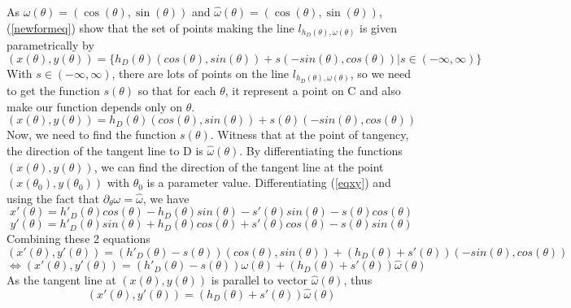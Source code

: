 \documentclass[a4paper]{article}
\begin{document}
\noindent As $\omega(\theta) = (\cos(\theta),\sin(\theta))$ and $\hat{\omega}(\theta) = (\cos(\theta),\sin(\theta))$, (\ref{newformeq}) show that the set of points making the line $l_{h_D(\theta),\omega(\theta)}$ is given parametrically by
\begin{equation*}
    (x(\theta),y(\theta)) = \{h_D(\theta)(cos(\theta),sin(\theta)) + s(-sin(\theta),cos(\theta)) | s \in (-\infty,\infty)\}
\end{equation*}
With $s \in (-\infty,\infty)$, there are lots of points on the line $l_{h_D(\theta),\omega(\theta)}$, so we need to get the function $s(\theta)$ so that for each $\theta$, it represent a point on C and also make our function depends only on $\theta$.
\begin{equation}\label{eqxy}
    (x(\theta),y(\theta)) = h_D(\theta)(cos(\theta),sin(\theta)) + s(\theta)(-sin(\theta),cos(\theta))
\end{equation}
Now, we need to find the function $s(\theta)$. Witness that at the point of tangency, the direction of the tangent line to D is $\hat{\omega}(\theta)$. By differentiating the functions $(x(\theta),y(\theta))$, we can find the direction of the tangent line at the point $(x(\theta_0),y(\theta_0))$ with $\theta_0$ is a parameter value. Differentiating (\ref{eqxy}) and using the fact that $\partial_\theta \omega = \hat{\omega}$, we have
\begin{equation*}
    x'(\theta) = h'_D(\theta)cos(\theta) - h_D(\theta)sin(\theta) - s'(\theta)sin(\theta) - s(\theta)cos(\theta)
\end{equation*}
\begin{equation*}
    y'(\theta) = h'_D(\theta)sin(\theta) + h_D(\theta)cos(\theta) + s'(\theta)cos(\theta) - s(\theta)sin(\theta)
\end{equation*}
Combining these 2 equations
\begin{equation*}
    (x'(\theta),y'(\theta)) = (h'_D(\theta) - s(\theta))(cos(\theta),sin(\theta)) + (h_D(\theta) + s'(\theta))(-sin(\theta),cos(\theta))
\end{equation*}
\begin{equation}
    \Leftrightarrow(x'(\theta),y'(\theta)) = (h'_D(\theta) - s(\theta))\omega(\theta) + (h_D(\theta) + s'(\theta))\hat{\omega}(\theta)
\end{equation}
As the tangent line at $(x(\theta),y(\theta))$ is parallel to vector $\hat{\omega}(\theta)$, thus
\begin{equation}\label{eqpara}
    (x'(\theta),y'(\theta)) = (h_D(\theta) + s'(\theta))\hat{\omega}(\theta)
\end{equation}
\end{document}
